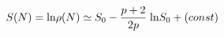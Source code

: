 \begin{equation}\label{sp}
S(N) = {\rm ln} \rho(N) \simeq S_0 - \frac{p + 2}{2 p} \; 
{\rm ln} S_0 + (const) 
\end{equation} 
